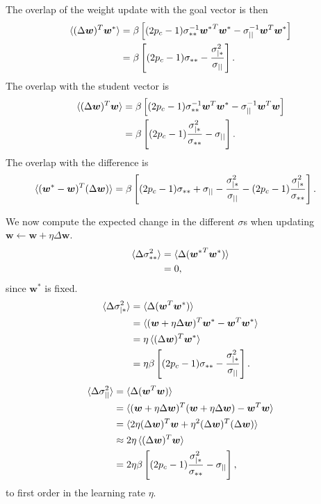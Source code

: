 \documentclass{article}
\renewcommand\b\bm
\begin{document}
The overlap of the weight update with the goal vector is then
\begin{align}
    \braket{ (\Delta \b{w})^T \b{w}^*} &= \beta \left [  (2 p_c - 1) \sigma_{**}^{-1} {\b{w}^*}^T \b{w}^* - \sigma_{||}^{-1} \b{w}^T \b{w}^* \right ] \\ 
     &= \beta \left [  (2 p_c - 1) \sigma_{**} - \frac{\sigma_{|*}^2}{\sigma_{||}} \right ].
\end{align}
The overlap with the student vector is
\begin{align}
    \braket{ (\Delta \b{w})^T \b{w}} &= \beta \left [  (2 p_c - 1) \sigma_{**}^{-1} \b{w}^T \b{w}^* - \sigma_{||}^{-1} \b{w}^T \b{w} \right ] \\ 
     &= \beta \left [  (2 p_c - 1) \frac{\sigma_{|*}^2}{\sigma_{**}} - \sigma_{||} \right ].
\end{align}
The overlap with the difference is
\begin{align}
    \braket{ (\b{w}^* - \b{w})^T (\Delta \b{w})} &= \beta \left [  (2 p_c - 1) \sigma_{**} + \sigma_{||} - \frac{\sigma_{|*}^2}{\sigma_{||}} - (2 p_c - 1) \frac{\sigma_{|*}^2}{\sigma_{**}} \right ].
\end{align}

We now compute the expected change in the different $\sigma$s when updating $\b{w} \leftarrow \b{w} + \eta \Delta \b{w}$.
\begin{align}
    \braket{\Delta \sigma_{**}^2} &= \braket{\Delta ({\b{w}^*}^T \b{w}^*)}\\
    &= 0,
\end{align}
since $\b{w}^*$ is fixed.
\begin{align}
    \braket{\Delta \sigma_{|*}^2} &= \braket{\Delta (\b{w}^T \b{w}^*)}\\
    &= \braket{(\b{w} + \eta \Delta \b{w})^T \b{w}^* - \b{w}^T \b{w}^*}\\
    &= \eta \braket{(\Delta \b{w})^T \b{w}^*}\\
    &= \eta \beta \left [  (2 p_c - 1) \sigma_{**} - \frac{\sigma_{|*}^2}{\sigma_{||}} \right ].
\end{align}
\begin{align}
    \braket{\Delta \sigma_{||}^2} &= \braket{\Delta (\b{w}^T \b{w})}\\
    &= \braket{(\b{w} + \eta \Delta \b{w})^T (\b{w} + \eta \Delta \b{w}) - \b{w}^T \b{w}}\\
    &= \braket{2 \eta (\Delta \b{w})^T \b{w} + \eta^2 (\Delta \b{w})^T (\Delta \b{w})}\\
    &\approx 2 \eta \braket{(\Delta \b{w})^T \b{w}}\\
    &= 2 \eta \beta \left [  (2 p_c - 1) \frac{\sigma_{|*}^2}{\sigma_{**}} - \sigma_{||} \right ],
\end{align}
to first order in the learning rate $\eta$.
\end{document}
